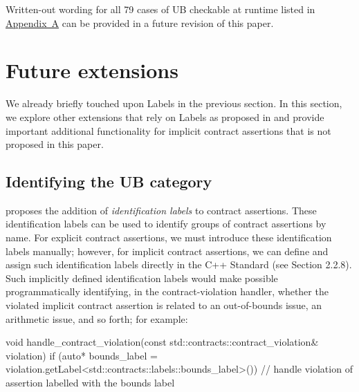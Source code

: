 Written-out wording for all 79 cases of UB checkable at runtime listed in \hyperref[appendix]{Appendix~A} can be provided in a future revision of this paper.


\section{Future extensions}
\label{ext}

We already briefly touched upon Labels in the previous section. In this section, we explore other exten\-sions that rely on Labels as proposed in \cite{P3400R1} and provide important additional functionality for implicit contract assertions that is not proposed in this paper.

\subsection{Identifying the UB category}
\label{idlabels}

\cite{P3400R1} proposes the addition of \emph{identification labels} to contract assertions. These identification labels can be used to identify groups of contract assertions by name. For explicit contract assertions, we must introduce these identification labels manually; however, for implicit contract assertions, we can define and assign such identification labels directly in the C++ Standard (see \cite{P3400R1} Section 2.2.8). Such implicitly defined identification labels would make possible programmatically identifying, in the contract-violation handler, whether the violated implicit contract assertion  is related to an out-of-bounds issue, an arithmetic issue, and so forth; for example:

\begin{codeblock}
void handle_contract_violation(const std::contracts::contract_violation& violation)
{
  if (auto* bounds_label =
      violation.getLabel<std::contracts::labels::bounds_label>()) {
      // handle violation of assertion labelled with the bounds label
  }
}
\end{codeblock} 

%
%

